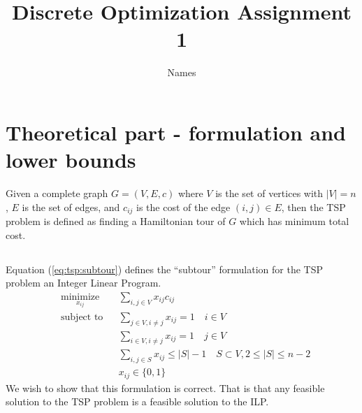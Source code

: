 \documentclass[11pt,a4paper,english]{article}
\begin{document}
\title{Discrete Optimization Assignment 1}
\author{Names}
\maketitle
\tableofcontents
\clearpage

\section{Theoretical part - formulation and lower bounds}
Given a complete graph $G = (V, E, c)$ where $V$ is the set of vertices with
$|V| = n$, $E$ is the set of edges, and $c_{ij}$ is the cost
of the edge $(i,j) \in E$, then the TSP problem is defined as finding a
 Hamiltonian tour of $G$ which has minimum total cost.
 \subsection{}
 Equation (\ref{eq:tsp:subtour}) defines the  ``subtour''  formulation
  for the TSP problem  an Integer
  Linear Program.
 \begin{equation}
   \label{eq:tsp:subtour}
   \begin{aligned}
     & \underset{x_{ij}}{\text{minimize}}
     & & \sum_{i,j \in V} x_{ij}c_{ij} \\
     & \text{subject to}
     & & \sum_{j \in V, i \neq j} x_{ij} = 1 \quad i \in V \\
     & & & \sum_{i \in V, i \neq j} x_{ij} = 1 \quad j \in V \\
     & & & \sum_{i,j \in S} x_{ij} \leq |S| - 1 \quad S \subset V, 2 \leq |S| \leq n-2 \\
     & & & x_{ij} \in \{0,1\}
   \end{aligned}
 \end{equation}
 We wish to show that this formulation is correct. That is that any feasible
 solution to the TSP problem is a feasible solution to
 the ILP.
\end{document}
